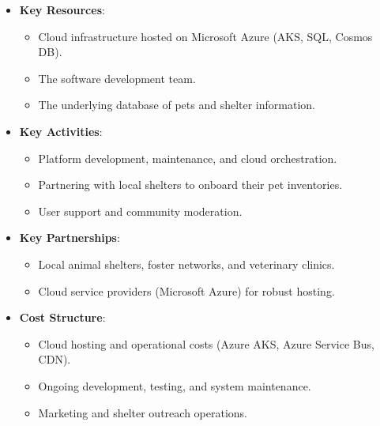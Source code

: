 \begin{itemize}
    \item \textbf{Key Resources}: 
    \begin{itemize}
        \item Cloud infrastructure hosted on Microsoft Azure (AKS, SQL, Cosmos DB).
        \item The software development team.
        \item The underlying database of pets and shelter information.
    \end{itemize}
    
    \item \textbf{Key Activities}: 
    \begin{itemize}
        \item Platform development, maintenance, and cloud orchestration.
        \item Partnering with local shelters to onboard their pet inventories.
        \item User support and community moderation.
    \end{itemize}
    
    \item \textbf{Key Partnerships}: 
    \begin{itemize}
        \item Local animal shelters, foster networks, and veterinary clinics.
        \item Cloud service providers (Microsoft Azure) for robust hosting.
    \end{itemize}
    
    \item \textbf{Cost Structure}: 
    \begin{itemize}
        \item Cloud hosting and operational costs (Azure AKS, Azure Service Bus, CDN).
        \item Ongoing development, testing, and system maintenance.
        \item Marketing and shelter outreach operations.
    \end{itemize}
\end{itemize}
